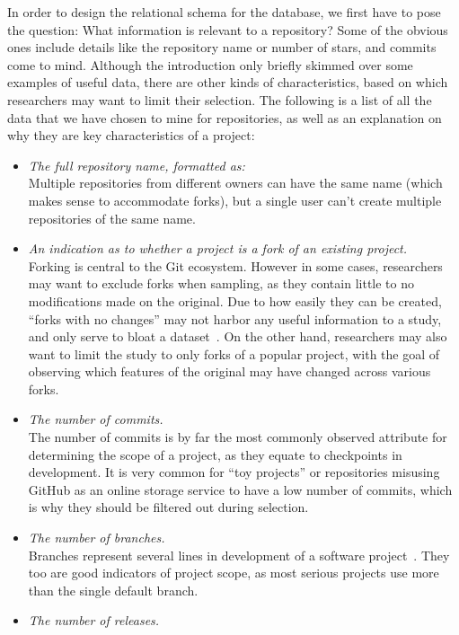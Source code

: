 In order to design the relational schema for the database, we first have to pose the question: What information is relevant to a repository?
Some of the obvious ones include details like the repository name or number of stars, and commits come to mind.
Although the introduction only briefly skimmed over some examples of useful data, there are other kinds of characteristics, based on which researchers may want to limit their selection.
The following is a list of all the data that we have chosen to mine for repositories, as well as an explanation on why they are key characteristics of a project:
\begin{itemize}
    \item \textit{The full repository name, formatted as:} 
    \\Multiple repositories from different owners can have the same name (which makes sense to accommodate forks), but a single user can't create multiple repositories of the same name.
    \item \textit{An indication as to whether a project is a fork of an existing project.}
    \\Forking is central to the Git ecosystem. However in some cases, researchers may want to exclude forks when sampling, as they contain little to no modifications made on the original. Due to how easily they can be created, ``forks with no changes'' may not harbor any useful information to a study, and only serve to bloat a dataset~\cite{FORKS}. On the other hand, researchers may also want to limit the study to only forks of a popular project, with the goal of observing which features of the original may have changed across various forks.
    \item \textit{The number of commits.}
    \\The number of commits is by far the most commonly observed attribute for determining the scope of a project, as they equate to checkpoints in development. It is very common for ``toy projects'' or repositories misusing GitHub as an online storage service to have a low number of commits, which is why they should be filtered out during selection.
    \item \textit{The number of branches.}
    \\Branches represent several lines in development of a software project~\cite{GIT}. They too are good indicators of project scope, as most serious projects use more than the single default branch.
    \item \textit{The number of releases.}

\end{itemize}

